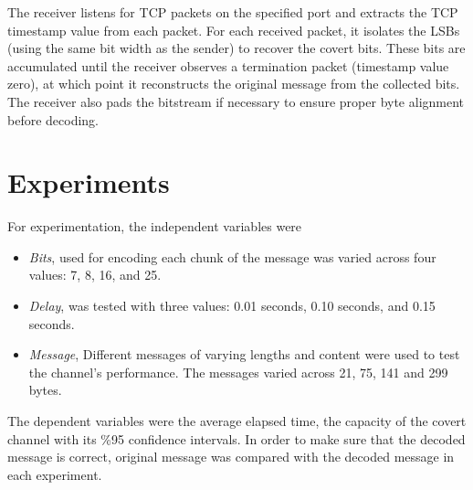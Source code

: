 \documentclass[10pt,a4paper]{article}
\begin{document}
The receiver listens for TCP packets on the specified port and extracts the TCP timestamp value from each packet.
 For each received packet, it isolates the LSBs (using the same bit width as the sender) to recover the covert bits. 
 These bits are accumulated until the receiver observes a termination packet (timestamp value zero), at which point it reconstructs the original message from the collected bits.
  The receiver also pads the bitstream if necessary to ensure proper byte alignment before decoding.


\section*{Experiments}
For experimentation, the independent variables were 
\begin{itemize}
    \item \textit{Bits}, used for encoding each chunk of the message was varied across four values: 7, 8, 16, and 25.
    \item \textit{Delay}, was tested with three values: 0.01 seconds, 0.10 seconds, and 0.15 seconds.
    \item \textit{Message}, Different messages of varying lengths and content were used to test the channel's performance. The messages varied across 21, 75, 141 and 299 bytes.

\end{itemize}

The dependent variables were the average elapsed time, the capacity of the covert channel with its \%95 confidence intervals.
In order to make sure that the decoded message is correct, original message was compared with the decoded message in each experiment. 
\end{document}

